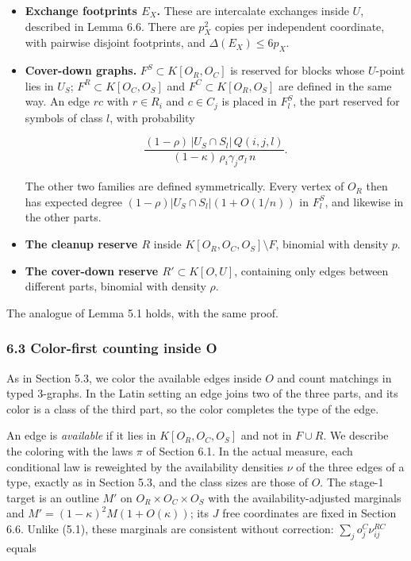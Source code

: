 \documentclass[english,11pt,a4paper]{article}
\begin{document}
\begin{itemize}
\item
  \textbf{Exchange footprints \(E_X\).} These are intercalate exchanges inside \(U\), described in Lemma 6.6. There are \(p_X^2\) copies per independent coordinate, with pairwise disjoint footprints, and \(\Delta(E_X)\le 6p_X\).
\item
  \textbf{Cover-down graphs.} \(F^S\subset K[O_R,O_C]\) is reserved for blocks whose \(U\)-point lies in \(U_S\); \(F^R\subset K[O_C,O_S]\) and \(F^C\subset K[O_R,O_S]\) are defined in the same way. An edge \(rc\) with \(r\in R_i\) and \(c\in C_j\) is placed in \(F^S_l\), the part reserved for symbols of class \(l\), with probability

  \[\frac{(1-\rho)\,|U_S\cap S_l|\,Q(i,j,l)}{(1-\kappa)\,\rho_i\gamma_j\sigma_l\,n}.\]

  The other two families are defined symmetrically. Every vertex of \(O_R\) then has expected degree \((1-\rho)|U_S\cap S_l|(1+O(1/n))\) in \(F^S_l\), and likewise in the other parts.
\item
  \textbf{The cleanup reserve \(R\)} inside \(K[O_R,O_C,O_S]\setminus F\), binomial with density \(p\).
\item
  \textbf{The cover-down reserve \(R'\subset K[O,U]\)}, containing only edges between different parts, binomial with density \(\rho\).
\end{itemize}

The analogue of Lemma 5.1 holds, with the same proof.

\subsubsection{6.3 Color-first counting inside O}\label{color-first-counting-inside-o-1}

As in Section 5.3, we color the available edges inside \(O\) and count matchings in typed 3-graphs. In the Latin setting an edge joins two of the three parts, and its color is a class of the third part, so the color completes the type of the edge.

An edge is \emph{available} if it lies in \(K[O_R,O_C,O_S]\) and not in \(F\cup R\). We describe the coloring with the laws \(\pi\) of Section 6.1. In the actual measure, each conditional law is reweighted by the availability densities \(\nu\) of the three edges of a type, exactly as in Section 5.3, and the class sizes are those of \(O\). The stage-1 target is an outline \(M'\) on \(O_R\times O_C\times O_S\) with the availability-adjusted marginals and \(M'=(1-\kappa)^2M(1+O(\kappa))\); its \(J\) free coordinates are fixed in Section 6.6. Unlike (5.1), these marginals are consistent without correction: \(\sum_jo^C_j\nu^{RC}_{ij}\) equals
\end{document}
